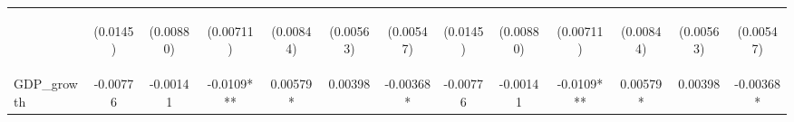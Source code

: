 \documentclass[]{article}
\begin{document}
\begin{center}
\begin{tabular}{lcccccccccccc}
\vspace{4pt} & \begin{footnotesize}(0.0145)\end{footnotesize} & \begin{footnotesize}(0.00880)\end{footnotesize} & \begin{footnotesize}(0.00711)\end{footnotesize} & \begin{footnotesize}(0.00844)\end{footnotesize} & \begin{footnotesize}(0.00563)\end{footnotesize} & \begin{footnotesize}(0.00547)\end{footnotesize} & \begin{footnotesize}(0.0145)\end{footnotesize} & \begin{footnotesize}(0.00880)\end{footnotesize} & \begin{footnotesize}(0.00711)\end{footnotesize} & \begin{footnotesize}(0.00844)\end{footnotesize} & \begin{footnotesize}(0.00563)\end{footnotesize} & \begin{footnotesize}(0.00547)\end{footnotesize} \\
GDP\_growth & -0.00776 & -0.00141 & -0.0109*** & 0.00579* & 0.00398 & -0.00368* & -0.00776 & -0.00141 & -0.0109*** & 0.00579* & 0.00398 & -0.00368* \\

\end{tabular}
\end{center}
\end{document}
